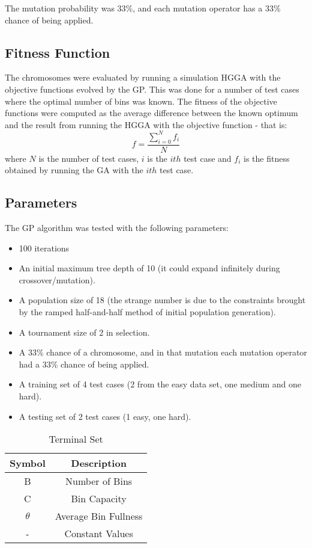 \documentclass[conference]{IEEEtran}
\begin{document}
The mutation probability was 33\%, and each mutation operator has a 33\% chance of being applied.

\subsection{Fitness Function}
The chromosomes were evaluated by running a simulation HGGA with the objective functions evolved by the GP. This was done for a number of test cases where the optimal number of bins was known. The fitness of the objective functions were computed as the average difference between the known optimum and the result from running the HGGA with the objective function - that is:
\[
    f = \frac{\sum_{i=0}^{N}f_i}{N}
\]
where $N$ is the number of test cases, $i$ is the $ith$ test case and $f_i$ is the fitness obtained by running the GA with the $ith$ test case.

\subsection{Parameters}
The GP algorithm was tested with the following parameters:
\begin{itemize}
  \item 100 iterations
  \item An initial maximum tree depth of 10 (it could expand infinitely during crossover/mutation).
  \item A population size of 18 (the strange number is due to the constraints brought by the ramped half-and-half method of initial population generation).
  \item A tournament size of 2 in selection.
  \item A 33\% chance of a chromosome, and in that mutation each mutation operator had a 33\% chance of being applied.
  \item A training set of 4 test cases (2 from the easy data set, one medium and one hard).
  \item A testing set of 2 test cases (1 easy, one hard).
\end{itemize}

\begin{table*}[h]
\centering
\renewcommand{\arraystretch}{1.3}
\caption{Terminal Set}
\label{terminal_set}
\begin{tabular}{c|c}
Symbol & Description \\
\hline
B & Number of Bins \\
C & Bin Capacity \\
$\theta$ & Average Bin Fullness \\
- & Constant Values \\
\hline
\end{tabular}
\end{table*}
\end{document}
